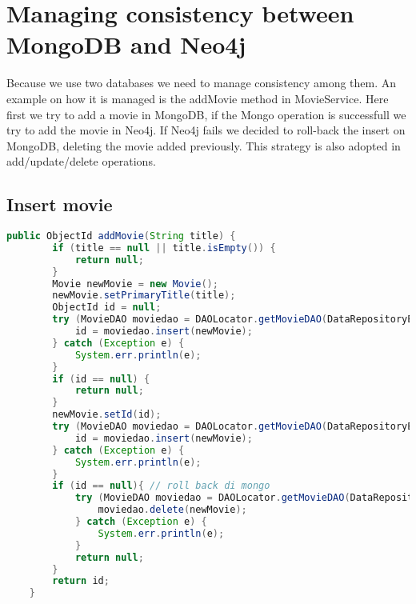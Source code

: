 \section{Managing consistency between MongoDB and Neo4j}
Because we use two databases we need to manage consistency among them. An example on how it is managed is the addMovie method in MovieService. Here first we try to add a movie in MongoDB, if the Mongo operation is successfull we try to add the movie in Neo4j. If Neo4j fails we decided to roll-back the insert on MongoDB, deleting the movie added previously. This strategy is also adopted in add/update/delete operations.
\subsection{Insert movie}
\begin{lstlisting}[language=Java]
public ObjectId addMovie(String title) {
        if (title == null || title.isEmpty()) {
            return null;
        }
        Movie newMovie = new Movie();
        newMovie.setPrimaryTitle(title);
        ObjectId id = null;
        try (MovieDAO moviedao = DAOLocator.getMovieDAO(DataRepositoryEnum.MONGO)) {
            id = moviedao.insert(newMovie);
        } catch (Exception e) {
            System.err.println(e);
        }
        if (id == null) {
            return null;
        }
        newMovie.setId(id);
        try (MovieDAO moviedao = DAOLocator.getMovieDAO(DataRepositoryEnum.NEO4j)) {
            id = moviedao.insert(newMovie);
        } catch (Exception e) {
            System.err.println(e);
        }
        if (id == null){ // roll back di mongo
            try (MovieDAO moviedao = DAOLocator.getMovieDAO(DataRepositoryEnum.MONGO)) {
                moviedao.delete(newMovie);
            } catch (Exception e) {
                System.err.println(e);
            }
            return null;
        }
        return id;
    }
\end{lstlisting}

%